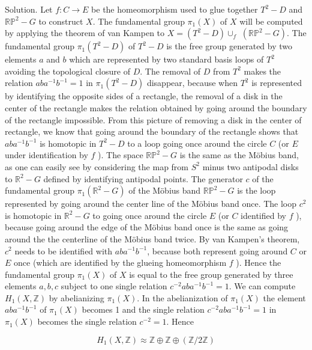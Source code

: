 \documentclass[10pt]{article}
\begin{document}
Solution. Let $f: C \rightarrow E$ be the homeomorphism used to glue together $T^{2}-D$ and $\mathbb{R P}^{2}-G$ to construct $X$. The fundamental group $\pi_{1}(X)$ of $X$ will be computed by applying the theorem of van Kampen to $X=\left(T^{2}-D\right) \cup_{f}$ $\left(\mathbb{R P}^{2}-G\right)$. The fundamental group $\pi_{1}\left(T^{2}-D\right)$ of $T^{2}-D$ is the free group generated by two elements $a$ and $b$ which are represented by two standard basis loops of $T^{2}$ avoiding the topological closure of $D$. The removal of $D$ from $T^{2}$ makes the relation $a b a^{-1} b^{-1}=1$ in $\pi_{1}\left(T^{2}-D\right)$ disappear, because when $T^{2}$ is represented by identifying the opposite sides of a rectangle, the removal of a disk in the center of the rectangle makes the relation obtained by going around the boundary of the rectangle impossible. From this picture of removing a disk in the center of rectangle, we know that going around the boundary of the rectangle shows that $a b a^{-1} b^{-1}$ is homotopic in $T^{2}-D$ to a loop going once around the circle $C$ (or $E$ under identification by $f$ ). The space $\mathbb{R P}^{2}-G$ is the same as the Möbius band, as one can easily see by considering the map from $S^{2}$ minus two antipodal disks to $\mathbb{R}^{2}-G$ defined by identifying antipodal points. The generator $c$ of the fundamental group $\pi_{1}\left(\mathbb{R}^{2}-G\right)$ of the Möbius band $\mathbb{R} \mathbb{P}^{2}-G$ is the loop represented by going around the center line of the Möbius band once. The loop $c^{2}$ is homotopic in $\mathbb{R}^{2}-G$ to going once around the circle $E$ (or $C$ identified by $f$ ), because going around the edge of the Möbius band once is the same as going around the the centerline of the Möbius band twice. By van Kampen's theorem, $c^{2}$ needs to be identified with $a b a^{-1} b^{-1}$, because both represent going around $C$ or $E$ once (which are identified by the glueing homeomorphism $f$ ). Hence the fundamental group $\pi_{1}(X)$ of $X$ is equal to the free group generated by three elements $a, b, c$ subject to one single relation $c^{-2} a b a^{-1} b^{-1}=1$. We can compute $H_{1}(X, \mathbb{Z})$ by abelianizing $\pi_{1}(X)$. In the abelianization of $\pi_{1}(X)$ the element $a b a^{-1} b^{-1}$ of $\pi_{1}(X)$ becomes 1 and the single relation $c^{-2} a b a^{-1} b^{-1}=1$
in $\pi_{1}(X)$ becomes the single relation $c^{-2}=1$. Hence

$$
H_{1}(X, \mathbb{Z}) \approx \mathbb{Z} \oplus \mathbb{Z} \oplus(\mathbb{Z} / 2 \mathbb{Z})
$$
\end{document}
